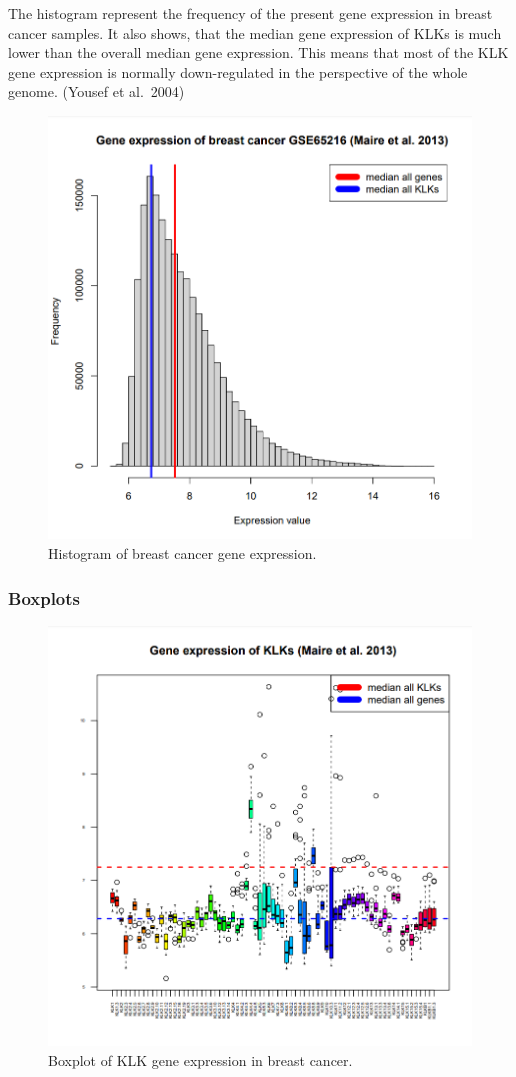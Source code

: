\documentclass[
]{article}
\begin{document}
The histogram represent the frequency of the present gene expression in
breast cancer samples. It also shows, that the median gene expression of
KLKs is much lower than the overall median gene expression. This means
that most of the KLK gene expression is normally down-regulated in the
perspective of the whole genome. (Yousef et al.~2004)

\begin{figure}

{\centering \includegraphics[width=0.5\linewidth]{images/Histogram_breast} 

}

\caption{Histogram of breast cancer gene expression.}\label{fig:Histogram - breast }
\end{figure}

\hypertarget{boxplots}{%
\subsubsection{Boxplots}\label{boxplots}}

\begin{figure}

{\centering \includegraphics[width=0.5\linewidth]{images/Boxplot_breast} 

}

\caption{Boxplot of KLK gene expression in breast cancer.}\label{fig:Boxplot - breast }
\end{figure}
\end{document}
